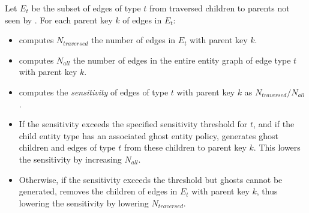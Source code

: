 \begin{enumerate}
        Let $E_t$ be the subset of
        edges of type $t$ from traversed children to parents not seen by \sys{}. For each parent key $k$ of
        edges in $E_t$:
    \begin{itemize}
        \item \sys{} computes $N_{traversed}$ the number of edges in $E_t$ with parent key $k$.
        \item \sys{} computes $N_{all}$ the number of edges in the entire entity graph of edge
            type $t$ with parent key $k$.
        \item \sys{} computes the \emph{sensitivity} of edges of type $t$ with parent key $k$ as $N_{traversed}/N_{all}$.
    \item If the sensitivity exceeds the specified sensitivity threshold for $t$,
        and if the child entity type has an associated ghost entity policy, \sys{}
        generates ghost children and edges of type $t$ from these children to parent
        key $k$. This lowers the sensitivity by increasing $N_{all}$.
    \item Otherwise, if the sensitivity exceeds the threshold but ghosts cannot be generated,
        \sys{} removes the children of edges in $E_t$ with parent key $k$, thus lowering the
            sensitivity by lowering $N_{traversed}$.
    \end{itemize}
\end{enumerate}



%


